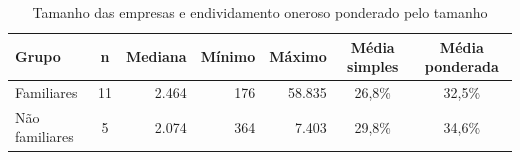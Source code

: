 \begin{table}[htb]
\caption{Tamanho das empresas e endividamento oneroso ponderado pelo tamanho}\label{tab:tamanho}
\centering\footnotesize\setlength{\tabcolsep}{4pt}
\begin{tabular}{lcrrrcc}
\toprule
Grupo & n & Mediana & Mínimo & Máximo & Média simples & Média ponderada \\
\midrule
Familiares & 11 & 2.464 & 176 & 58.835 & 26,8\% & 32,5\% \\
Não familiares & 5 & 2.074 & 364 & 7.403 & 29,8\% & 34,6\% \\
\bottomrule
\end{tabular}
\end{table}
